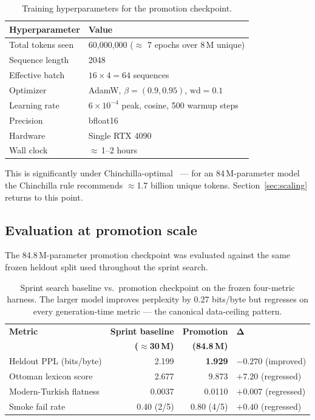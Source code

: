 \documentclass[11pt,a4paper]{article}
\begin{document}
\begin{table}[t]
  \centering\small
  \begin{tabular}{ll}
    \toprule
    \textbf{Hyperparameter} & \textbf{Value} \\
    \midrule
    Total tokens seen & 60{,}000{,}000 ($\approx$ 7 epochs over 8\,M unique) \\
    Sequence length & 2048 \\
    Effective batch & $16 \times 4 = 64$ sequences \\
    Optimizer & AdamW, $\beta = (0.9, 0.95)$, $\text{wd}=0.1$ \\
    Learning rate & $6 \times 10^{-4}$ peak, cosine, 500 warmup steps \\
    Precision & bfloat16 \\
    Hardware & Single RTX 4090 \\
    Wall clock & $\approx$\,1--2 hours \\
    \bottomrule
  \end{tabular}
  \caption{Training hyperparameters for the promotion checkpoint.}
  \label{tab:train}
\end{table}

This is significantly under Chinchilla-optimal~\citep{hoffmann2022chinchilla}
--- for an 84\,M-parameter model the Chinchilla rule recommends $\approx$1.7
billion unique tokens. Section~\ref{sec:scaling} returns to this point.

\subsection{Evaluation at promotion scale}

The 84.8\,M-parameter promotion checkpoint was evaluated against the same
frozen heldout split used throughout the sprint search.

\begin{table}[t]
  \centering\small
  \begin{tabular}{lrrl}
    \toprule
    \textbf{Metric} & \textbf{Sprint baseline} & \textbf{Promotion} & $\boldsymbol{\Delta}$ \\
                    & \textbf{($\approx$30\,M)} & \textbf{(84.8\,M)} & \\
    \midrule
    Heldout PPL (bits/byte)        & 2.199 & \textbf{1.929} & $-0.270$ (improved) \\
    Ottoman lexicon score          & 2.677 & 9.873          & $+7.20$ (regressed) \\
    Modern-Turkish flatness        & 0.0037 & 0.0110        & $+0.007$ (regressed) \\
    Smoke fail rate                & 0.40 (2/5) & 0.80 (4/5) & $+0.40$ (regressed) \\
    \bottomrule
  \end{tabular}
  \caption{Sprint search baseline vs.\ promotion checkpoint on the frozen
    four-metric harness. The larger model improves perplexity by 0.27
    bits/byte but regresses on every generation-time metric --- the
    canonical data-ceiling pattern.}
  \label{tab:promotion-eval}
\end{table}
\end{document}
